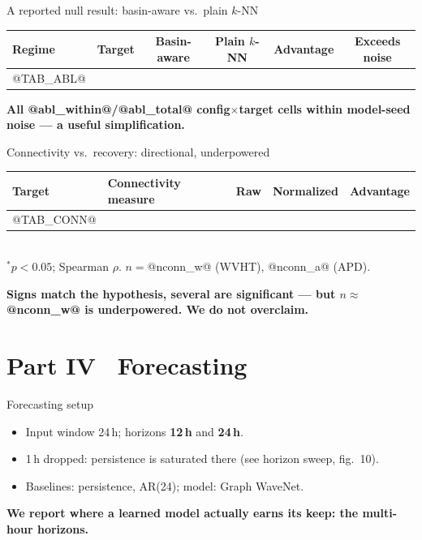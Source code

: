 \documentclass[aspectratio=169]{beamer}
\newcommand{\take}[1]{\vspace{0.6ex}\begin{center}\textbf{\color{colgraph}#1}\end{center}}
\begin{document}
\begin{frame}{A reported null result: basin-aware vs.\ plain $k$-NN}
  \begin{center}\footnotesize
  \begin{tabular}{l l ccc c}
    \toprule
    Regime & Target & Basin-aware & Plain $k$-NN & Advantage & Exceeds noise\\
    \midrule
@TAB_ABL@
    \bottomrule
  \end{tabular}
  \end{center}
  \take{All @abl_within@/@abl_total@ config$\times$target cells within model-seed noise --- a useful simplification.}
\end{frame}

\begin{frame}{Connectivity vs.\ recovery: directional, underpowered}
  \begin{center}\footnotesize
  \begin{tabular}{l l ccc}
    \toprule
    Target & Connectivity measure & Raw & Normalized & Advantage\\
    \midrule
@TAB_CONN@
    \bottomrule
  \end{tabular}\\[0.5ex]
  {\scriptsize $^{*}p<0.05$; Spearman $\rho$. $n=$@nconn_w@ (WVHT), @nconn_a@ (APD).}
  \end{center}
  \take{Signs match the hypothesis, several are significant --- but $n\approx$@nconn_w@ is underpowered. We do not overclaim.}
\end{frame}

\section{Part IV \textperiodcentered\ Forecasting}

\begin{frame}{Forecasting setup}
  \begin{itemize}
    \item Input window 24\,h; horizons \textbf{12\,h} and \textbf{24\,h}.
    \item 1\,h dropped: persistence is saturated there (see horizon sweep, fig.\ 10).
    \item Baselines: \textcolor{coltemporal}{persistence}, \textcolor{coltemporal}{AR(24)}; model: \textcolor{colgraph}{Graph WaveNet}.
  \end{itemize}
  \take{We report where a learned model actually earns its keep: the multi-hour horizons.}
\end{frame}
\end{document}

